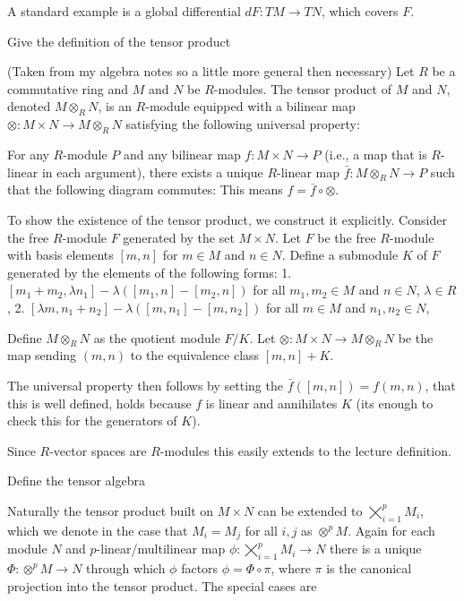 A standard example is a global differential \( dF : TM \to TN \),
which covers \( F \).


Give the definition of the tensor product

(Taken from my algebra notes so a little more general then necessary)
Let \( R \) be a commutative ring and \( M \) and \( N \) be \( R \)-modules. 
The tensor product of \( M \) and \( N \), denoted \( M \otimes_R N \), is an \( R \)-module equipped 
with a bilinear map \( \otimes: M \times N \to M \otimes_R N \) satisfying the following universal property:

For any \( R \)-module \( P \) and any bilinear map \( f: M \times N \to P \) (i.e., a map that is \( R \)-linear in each argument), 
there exists a unique \( R \)-linear map \( \bar{f}: M \otimes_R N \to P \) such that the following diagram commutes:
This means \( f = \bar{f} \circ \otimes \).

To show the existence of the tensor product, we construct it explicitly. 
Consider the free \( R \)-module \( F \) generated by the set \( M \times N \). 
Let \( F \) be the free \( R \)-module with basis elements \( [m, n] \) for \( m \in M \) and \( n \in N \). 
Define a submodule \( K \) of \( F \) generated by the elements of the following forms:
1. \( [m_1 + m_2, \lambda n_1] - \lambda([m_1, n] - [m_2, n]) \) for all \( m_1, m_2 \in M \) and \( n \in N \), \( \lambda \in R \),
2. \( [\lambda m, n_1 + n_2] - \lambda([m, n_1] - [m, n_2]) \) for all \( m \in M \) and \( n_1, n_2 \in N \),

Define \( M \otimes_R N \) as the quotient module \( F / K \). 
Let \( \otimes: M \times N \to M \otimes_R N \) be the map sending \( (m, n) \) to the equivalence class \( [m, n] + K \). 

The universal property then follows by setting the \( \bar{f}([m, n]) = f(m, n) \), that this is well defined, holds because
\( f \) is linear and annihilates \( K \) (its enough to check this for the generators of \( K \)).

Since \( R \)-vector spaces are \( R \)-modules this easily extends to the lecture definition. 

Define the tensor algebra

Naturally the tensor product built on \(M \times N\) can be extended to \(\bigtimes_{i = 1}^{p} M_i\),
which we denote in the case that \(M_i = M_j\) for all \(i, j\) as \(\otimes^{p} M\).
Again for each module \(N\) and \(p\)-linear/multilinear map \(\phi : \bigtimes_{i = 1}^{p} M_i \to N \) 
there is a unique \(\Phi : \otimes^{p} M \to N\) through which \(\phi\) factors \(\phi = \Phi \circ \pi\), 
where \(\pi\) is the canonical projection into the tensor product.
The special cases are 

